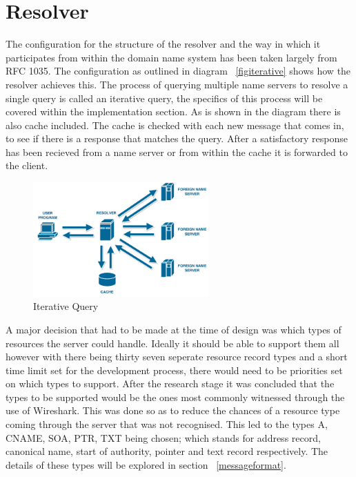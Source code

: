 \documentclass{l3proj}
\begin{document}
\section{Resolver}

The configuration for the structure of the resolver and the way in which it participates from within the domain name system has been taken largely from RFC 1035. The configuration as outlined in diagram ~\ref{figiterative} shows how the resolver achieves this. The process of querying multiple name servers to resolve a single query is called an iterative query, the specifics of this process will be covered within the implementation section. As is shown in the diagram there is also cache included. The cache is checked with each new message that comes in, to see if there is a response that matches the query. After a satisfactory response has been recieved from a name server or from within the cache it is forwarded to the client.

\begin{figure}[h]
    \centering
    \includegraphics[width=0.6\textwidth]{images/iterative_query.png}
    \caption{Iterative Query}
    \label{fig:iterative_query}
\end{figure}

A major decision that had to be made at the time of design was which types of resources the server could handle. Ideally it should be able to support them all however with there being thirty seven seperate resource record types and a short time limit set for the development process, there would need to be priorities set on which types to support. After the research stage it was concluded that the types to be supported would be the ones most commonly witnessed through the use of Wireshark. This was done so as to reduce the chances of a resource type coming through the server that was not recognised. This led to the types A, CNAME, SOA, PTR, TXT being chosen; which stands for address record, canonical name, start of authority, pointer and text record respectively. The details of these types will be explored in section ~\ref{messageformat}.
\end{document}
